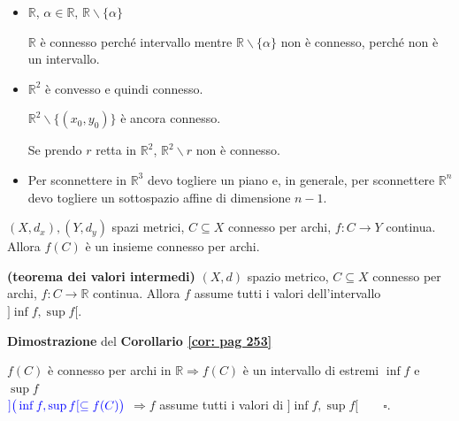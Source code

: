 \begin{exbar}
	\begin{itemize}
		\item $\mathbb{R}$, $\alpha \in \mathbb{R}$, $\mathbb{R} \backslash \{\alpha\}$
		
		$\mathbb{R}$ è connesso perché intervallo mentre $\mathbb{R} \backslash \{\alpha\}$ non è connesso, perché non è un intervallo.
		
		\item $\mathbb{R}^2$ è convesso e quindi connesso.
		
		$\mathbb{R}^2\backslash \{(x_0,y_0)\}$ è ancora connesso.
		
		
		Se prendo $r$ retta in $\mathbb{R}^2$, $\mathbb{R}^2\backslash r$ non è connesso.
		
		
		\item Per sconnettere in $\mathbb{R}^3$ devo togliere un piano e, in generale, per sconnettere $\mathbb{R}^n$ devo togliere un sottospazio affine di dimensione $n-1$.
	\end{itemize}
\end{exbar}


\begin{theorem}
	\label{th: pag 252}
	$(X,d_x),(Y,d_y)$ spazi metrici, $C \subseteq X$ connesso per archi, $f: C \rightarrow Y$ continua. Allora $f(C)$ è un insieme connesso per archi.
\end{theorem}


\begin{corollary} \textbf{(teorema dei valori intermedi)}
	\label{cor: pag 253}
	$(X,d)$ spazio metrico, $C \subseteq X$ connesso per archi, $f:C \rightarrow \mathbb{R}$ continua. Allora $f$ assume tutti i valori dell'intervallo $]\inf f, \sup f[$.
\end{corollary}


\begin{dembar}
	\textbf{Dimostrazione} del \textbf{Corollario \ref{cor: pag 253}}
	
	$f(C)$ è connesso per archi in $\mathbb{R} \Rightarrow f(C)$ è un intervallo di estremi $\inf f$ e $\sup f$ \\%
	${\color{blue} ] \big( \inf f, \sup f[ \subseteq f(C) \big)}$ $\Rightarrow f$ assume tutti i valori di $]\inf f, \sup f[ \qquad\square$.
\end{dembar}
	
